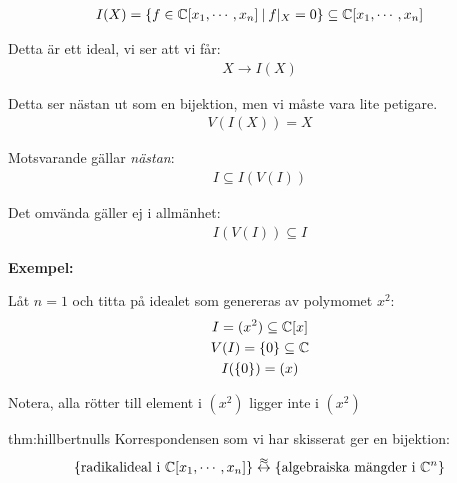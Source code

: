 \begin{equation*}
  \begin{gathered}
    I(X) = \left\{f\in\mathbb{C}[x_1,\cdots,x_n]\:|\: f|_X=0\right\}\subseteq\mathbb{C}[x_1,\cdots,x_n]
  \end{gathered}
\end{equation*}\par
\noindent Detta är ett ideal, vi ser att vi får:
\begin{equation*}
  \begin{gathered}
    X\to I(X)
  \end{gathered}
\end{equation*}\par
\noindent Detta ser nästan ut som en bijektion, men vi måste vara lite petigare.
\begin{equation*}
  \begin{gathered}
    V(I(X)) = X
  \end{gathered}
\end{equation*}\par
\noindent Motsvarande gällar \textit{nästan}:
\begin{equation*}
  \begin{gathered}
    I\subseteq I(V(I))
  \end{gathered}
\end{equation*}\par
\noindent Det omvända gäller ej i allmänhet:
\begin{equation*}
  \begin{gathered}
    I(V(I))\subseteq I
  \end{gathered}
\end{equation*}
\par\bigskip
\noindent\textbf{Exempel:}\par
\noindent Låt $n=1$ och titta på idealet som genereras av polymomet $x^2$:
\begin{equation*}
  \begin{gathered}
    I = (x^2)\subseteq\mathbb{C}[x]\\
    V(I) = \left\{0\right\}\subseteq \mathbb{C}\\
    I(\left\{0\right\}) = (x)
  \end{gathered}
\end{equation*}\par
\noindent Notera, alla rötter till element i $(x^2)$ ligger inte i $(x^2)$ 
\par\bigskip
\begin{theo}{thm:hillbertnulls}
  Korrespondensen som vi har skisserat ger en bijektion:
  \begin{equation*}
    \begin{gathered}
      \left\{\text{radikalideal i $\mathbb{C}[x_1,\cdots,x_n]$}\right\}\stackrel{\approx}{\leftrightarrow}\left\{\text{algebraiska mängder i }\mathbb{C}^n\right\}
    \end{gathered}
  \end{equation*}
\end{theo}
